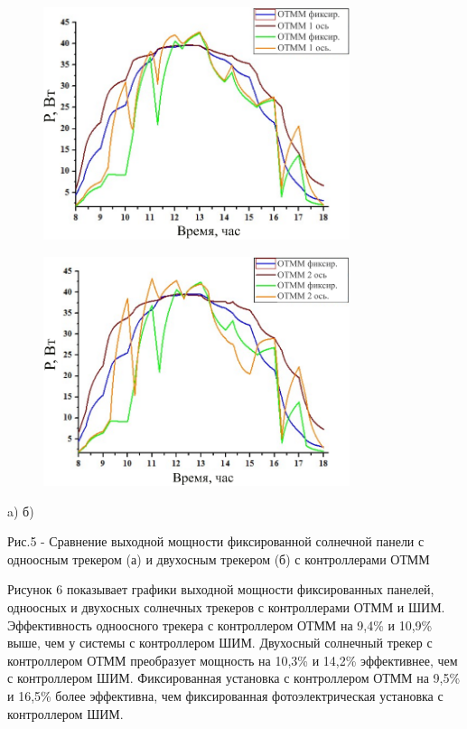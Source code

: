 \begin{figure}[H]
	\centering
	\includegraphics[width=0.8\textwidth]{media/ict/image11}
	\caption*{}
\end{figure}

\begin{figure}[H]
	\centering
	\includegraphics[width=0.8\textwidth]{media/ict/image12}
	\caption*{}
\end{figure}


a) б)

Рис.5 - Сравнение выходной мощности фиксированной солнечной панели с
одноосным трекером (а) и двухосным трекером (б) с контроллерами ОТММ

\begin{multicols}{2}
Рисунок 6 показывает графики выходной мощности фиксированных панелей,
одноосных и двухосных солнечных трекеров с контроллерами ОТММ и ШИМ.
Эффективность одноосного трекера с контроллером ОТММ на 9,4\% и 10,9\%
выше, чем у системы с контроллером ШИМ. Двухосный солнечный трекер с
контроллером ОТММ преобразует мощность на 10,3\% и 14,2\% эффективнее,
чем с контроллером ШИМ. Фиксированная установка с контроллером ОТММ на
9,5\% и 16,5\% более эффективна, чем фиксированная фотоэлектрическая
установка с контроллером ШИМ.
\end{multicols}


